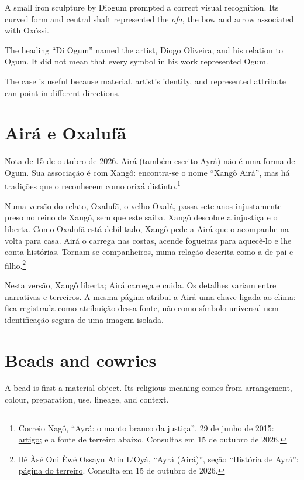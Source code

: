 A small iron sculpture by Diogum prompted a
correct visual recognition.  Its curved
form and central shaft represented the
\emph{ofa}, the bow and arrow associated
with Ox\'ossi.

The heading ``Di Ogum'' named the artist,
Diogo Oliveira, and his relation to Ogum.
It did not mean that every symbol in his
work represented Ogum.

The case is useful because material,
artist's identity, and represented attribute
can point in different directions.

\section{Airá e Oxalufã}
\label{section-aira-oxalufa}

Nota de 15 de outubro de 2026.
Airá (também escrito Ayrá) não é uma
forma de Ogum. Sua associação é com
Xangô: encontra-se o nome “Xangô Airá”,
mas há tradições que o reconhecem como
orixá distinto.\footnote{
Correio Nagô, “Ayrá: o manto branco
da justiça”, 29 de junho de 2015:
\href{https://correionago.com.br/%
ayra-o-manto-branco-da-justica/}
{artigo}; e a fonte de terreiro abaixo.
Consultas em 15 de outubro de 2026.}

Numa versão do relato, Oxalufã, o velho
Oxalá, passa sete anos injustamente
preso no reino de Xangô, sem que este
saiba. Xangô descobre a injustiça e o
liberta. Como Oxalufã está debilitado,
Xangô pede a Airá que o acompanhe na
volta para casa. Airá o carrega nas
costas, acende fogueiras para aquecê-lo
e lhe conta histórias. Tornam-se
companheiros, numa relação descrita
como a de pai e filho.\footnote{
Ilê Àsé Oni Èwé Ossayn Atin L'Oyá,
“Ayrá (Airá)”, seção
“História de Ayrá”:
\href{https://www.bruxodailha.com.br/%
orixas/ayra/}{página do terreiro}.
Consulta em 15 de outubro de 2026.}

Nesta versão, Xangô liberta; Airá
carrega e cuida. Os detalhes variam
entre narrativas e terreiros.
A mesma página atribui a Airá uma chave
ligada ao clima: fica registrada como
atribuição dessa fonte, não como
símbolo universal nem identificação
segura de uma imagem isolada.

\section{Beads and cowries}
\label{section-beads-cowries}

A bead is first a material object.  Its
religious meaning comes from arrangement,
colour, preparation, use, lineage, and
context.

